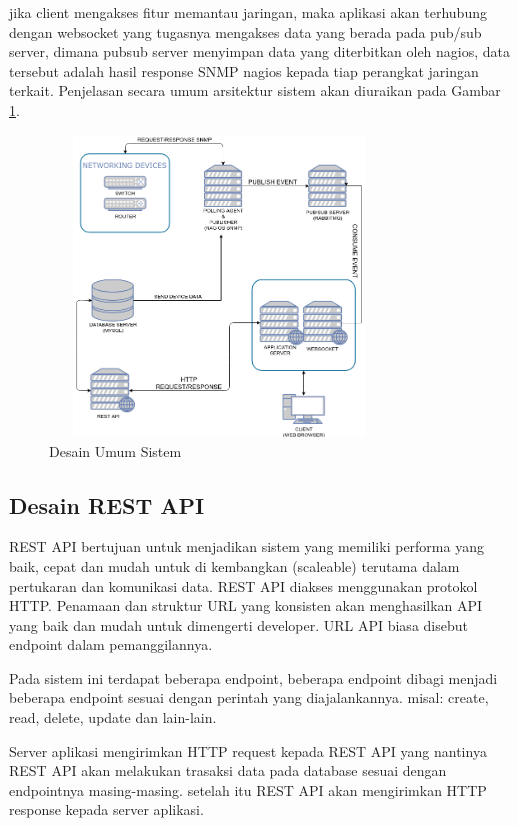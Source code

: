 			jika client mengakses fitur memantau jaringan, maka aplikasi akan terhubung dengan websocket yang tugasnya mengakses data yang berada pada pub/sub server, dimana pubsub server menyimpan data yang diterbitkan oleh nagios, data tersebut adalah hasil response SNMP nagios kepada tiap perangkat jaringan terkait.
			Penjelasan secara umum arsitektur sistem akan diuraikan pada Gambar \ref{DesainUmumSistem}.
            \begin{figure}[H]
				\centering
				\includegraphics[width=9cm,height=8cm]{Images/C-3/main.png}
				\caption{Desain Umum Sistem}
				\label{DesainUmumSistem}
			\end{figure}

		\subsection{Desain REST API}
            	REST API bertujuan untuk menjadikan sistem yang memiliki performa yang baik, cepat dan mudah untuk di kembangkan (scaleable) terutama dalam pertukaran dan komunikasi data. REST API diakses menggunakan protokol HTTP. Penamaan dan struktur URL yang konsisten akan menghasilkan API yang baik dan mudah untuk dimengerti developer. URL API biasa disebut endpoint dalam pemanggilannya.
            	
            	Pada sistem ini terdapat beberapa endpoint, beberapa endpoint dibagi menjadi beberapa endpoint sesuai dengan perintah yang diajalankannya. misal: create, read, delete, update dan lain-lain.
            	
            	Server aplikasi mengirimkan HTTP request kepada REST API yang nantinya REST API akan melakukan trasaksi data pada database sesuai dengan endpointnya masing-masing. setelah itu REST API akan mengirimkan HTTP response kepada server aplikasi.
            	
